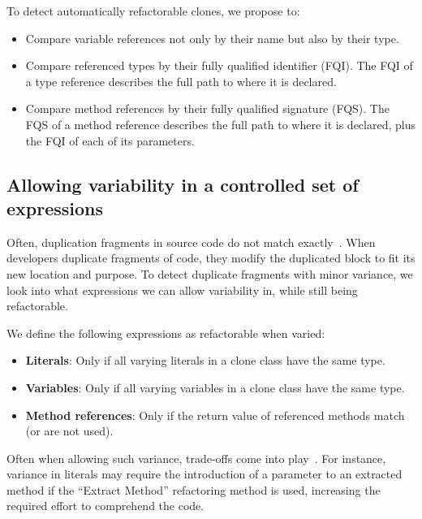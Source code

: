 \documentclass[conference]{IEEEtran}
\begin{document}
To detect automatically refactorable clones, we propose to:
\begin{itemize}
  \item Compare variable references not only by their name but also by their type.
  \item Compare referenced types by their fully qualified identifier (FQI). The FQI of a type reference describes the full path to where it is declared.
  \item Compare method references by their fully qualified signature (FQS). The FQS of a method reference describes the full path to where it is declared, plus the FQI of each of its parameters.
\end{itemize}

\subsection{Allowing variability in a controlled set of expressions} \label{sec:t2r}
Often, duplication fragments in source code do not match exactly~\cite{kodhai2013method}. When developers duplicate fragments of code, they modify the duplicated block to fit its new location and purpose. To detect duplicate fragments with minor variance, we look into what expressions we can allow variability in, while still being refactorable.

We define the following expressions as refactorable when varied:
\begin{itemize}
  \item \textbf{Literals}: Only if all varying literals in a clone class have the same type.
  \item \textbf{Variables}: Only if all varying variables in a clone class have the same type.
  \item \textbf{Method references}: Only if the return value of referenced methods match (or are not used).
\end{itemize}
Often when allowing such variance, trade-offs come into play~\cite{krishnan2013refactoring, krishnan2014unification}. For instance, variance in literals may require the introduction of a parameter to an extracted method if the ``Extract Method'' refactoring method is used, increasing the required effort to comprehend the code.
\end{document}
